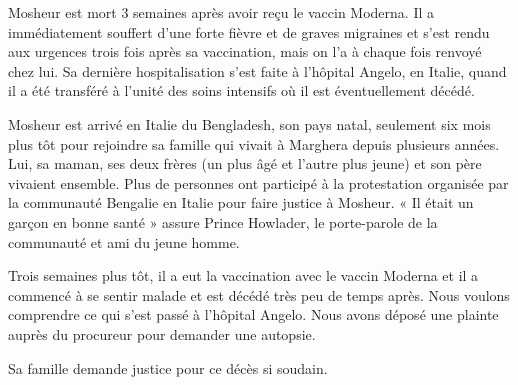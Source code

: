 Mosheur est mort 3 semaines après avoir reçu le vaccin Moderna. Il a
immédiatement souffert d’une forte fièvre et de graves migraines et s’est rendu
aux urgences trois fois après sa vaccination, mais on l’a à chaque fois renvoyé
chez lui. Sa dernière hospitalisation s’est faite à l’hôpital Angelo, en Italie,
quand il a été transféré à l’unité des soins intensifs où il est éventuellement
décédé.

Mosheur est arrivé en Italie du Bengladesh, son pays natal, seulement six mois
plus tôt pour rejoindre sa famille qui vivait à Marghera depuis plusieurs
années. Lui, sa maman, ses deux frères (un plus âgé et l’autre plus jeune) et
son père vivaient ensemble. Plus de personnes ont participé à la protestation
organisée par la communauté Bengalie en Italie pour faire justice à Mosheur. «
Il était un garçon en bonne santé » assure Prince Howlader, le porte-parole de
la communauté et ami du jeune homme.

Trois semaines plus tôt, il a eut la vaccination avec le vaccin Moderna et il a
commencé à se sentir malade et est décédé très peu de temps après. Nous voulons
comprendre ce qui s’est passé à l’hôpital Angelo. Nous avons déposé une plainte
auprès du procureur pour demander une autopsie.

Sa famille demande justice pour ce décès si soudain.

